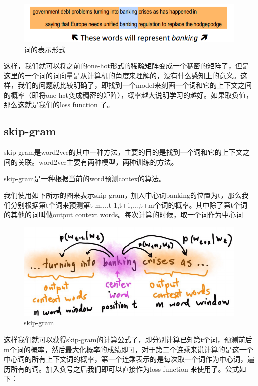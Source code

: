 	\begin{figure}[htbp]
	\centering\includegraphics[width=6in]{img/6-2.png}
	\caption{词的表示形式}\label{fig:6-2}
	\end{figure}
	
	这样，我们就可以将之前的one-hot形式的稀疏矩阵变成一个稠密的矩阵了，但是这里的一个词的词向量是从计算机的角度来理解的，没有什么感知上的意义。这样，我们的问题就比较明确了，即找到一个model来刻画一个词和它的上下文之间的概率（即将one-hot变成稠密的矩阵），概率越大说明学习的越好。如果取负值，那么这就是我们的loss function 了。
	
	
	\subsection{skip-gram}
	
	skip-gram是word2vec的其中一种方法，主要的目的是找到一个词和它的上下文之间的关联。word2vec主要有两种模型，两种训练的方法。
	
	skip-gram是一种根据当前的word预测contex的算法。
	
	我们使用如下所示的图来表示skip-gram，加入中心词banking的位置为t，那么我们分别根据第t个词来预测第t-m,...t-1,t+1,...,t+m个词的概率。其中除了第t个词的其他的词叫做output context words。每次计算的时候，取一个词作为中心词
	
	\begin{figure}[htbp]
	\centering\includegraphics[width=6in]{img/6-3.png}
	\caption{skip-gram}\label{fig:6-3}
	\end{figure}
	
	这样我们就可以获得skip-gram的计算公式了，即分别计算已知第t个词，预测前后m个词的概率，然后最大化概率的成绩即可，对于第二个连乘来说计算的是这一个中心词的所有上下文词的概率，第一个连乘表示的是每次取一个词作为中心词，遍历所有的词。加入负号之后我们即可以直接作为loss function 来使用了。公式如下：
	
